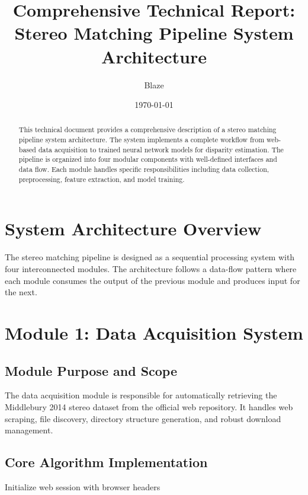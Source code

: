 \documentclass[12pt]{article}
\title{Comprehensive Technical Report: Stereo Matching Pipeline System Architecture}
\author{Blaze}
\date{\today}
\begin{document}
\maketitle

\begin{abstract}
This technical document provides a comprehensive description of a stereo matching pipeline system architecture. The system implements a complete workflow from web-based data acquisition to trained neural network models for disparity estimation. The pipeline is organized into four modular components with well-defined interfaces and data flow. Each module handles specific responsibilities including data collection, preprocessing, feature extraction, and model training.
\end{abstract}

\section{System Architecture Overview}

The stereo matching pipeline is designed as a sequential processing system with four interconnected modules. The architecture follows a data-flow pattern where each module consumes the output of the previous module and produces input for the next.

\section{Module 1: Data Acquisition System}

\subsection{Module Purpose and Scope}
The data acquisition module is responsible for automatically retrieving the Middlebury 2014 stereo dataset from the official web repository. It handles web scraping, file discovery, directory structure generation, and robust download management.

\subsection{Core Algorithm Implementation}

\begin{algorithm}[H]
\caption{Data Acquisition Main Workflow}
\begin{algorithmic}[1]
\State Initialize web session with browser headers
\State {} 
\State {} 
\State {} 
\State {}
    \State {}
    \State {}
\EndFor
\State \Return {}
\EndProcedure
\end{algorithmic}
\end{algorithm}
\end{document}
